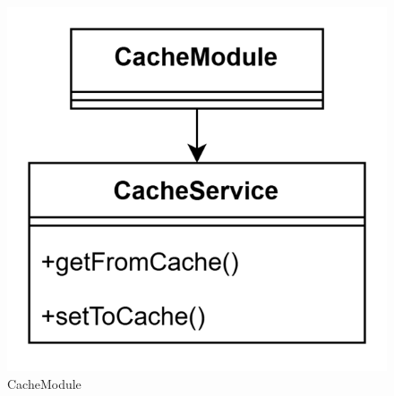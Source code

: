 \begin{itemize}
    \begin{figure}[h!] \centering       
        \includegraphics[scale = 0.3]{template/images/CacheModule.png}
        \caption{CacheModule}
    \end{figure}
\end{itemize}

